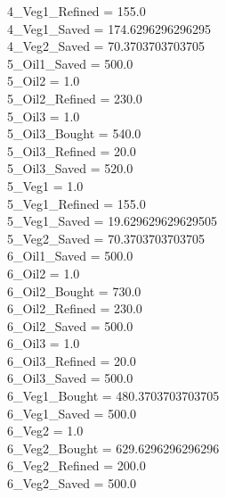 4\_Veg1\_Refined = 155.0\\
4\_Veg1\_Saved = 174.6296296296295\\
4\_Veg2\_Saved = 70.3703703703705\\
5\_Oil1\_Saved = 500.0\\
5\_Oil2 = 1.0\\
5\_Oil2\_Refined = 230.0\\
5\_Oil3 = 1.0\\
5\_Oil3\_Bought = 540.0\\
5\_Oil3\_Refined = 20.0\\
5\_Oil3\_Saved = 520.0\\
5\_Veg1 = 1.0\\
5\_Veg1\_Refined = 155.0\\
5\_Veg1\_Saved = 19.629629629629505\\
5\_Veg2\_Saved = 70.3703703703705\\
6\_Oil1\_Saved = 500.0\\
6\_Oil2 = 1.0\\
6\_Oil2\_Bought = 730.0\\
6\_Oil2\_Refined = 230.0\\
6\_Oil2\_Saved = 500.0\\
6\_Oil3 = 1.0\\
6\_Oil3\_Refined = 20.0\\
6\_Oil3\_Saved = 500.0\\
6\_Veg1\_Bought = 480.3703703703705\\
6\_Veg1\_Saved = 500.0\\
6\_Veg2 = 1.0\\
6\_Veg2\_Bought = 629.6296296296296\\
6\_Veg2\_Refined = 200.0\\
6\_Veg2\_Saved = 500.0\\